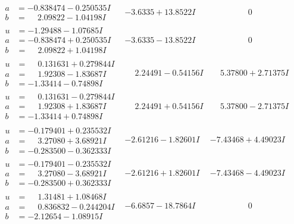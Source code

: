 \documentclass[1p]{elsarticle_modified}
\theoremstyle{definition}
\begin{document}
$$\begin{array}{c|c|c}
\begin{aligned}
a &= -0.838474 - 0.250535 I \\
b &= \phantom{-}2.09822 - 1.04198 I\end{aligned}
 & -3.6335 + 13.8522 I & \phantom{-0.000000 } 0 \\ \hline\begin{aligned}
u &= -1.29488 - 1.07685 I \\
a &= -0.838474 + 0.250535 I \\
b &= \phantom{-}2.09822 + 1.04198 I\end{aligned}
 & -3.6335 - 13.8522 I & \phantom{-0.000000 } 0 \\ \hline\begin{aligned}
u &= \phantom{-}0.131631 + 0.279844 I \\
a &= \phantom{-}1.92308 - 1.83687 I \\
b &= -1.33414 - 0.74898 I\end{aligned}
 & \phantom{-}2.24491 - 0.54156 I & \phantom{-}5.37800 + 2.71375 I \\ \hline\begin{aligned}
u &= \phantom{-}0.131631 - 0.279844 I \\
a &= \phantom{-}1.92308 + 1.83687 I \\
b &= -1.33414 + 0.74898 I\end{aligned}
 & \phantom{-}2.24491 + 0.54156 I & \phantom{-}5.37800 - 2.71375 I \\ \hline\begin{aligned}
u &= -0.179401 + 0.235532 I \\
a &= \phantom{-}3.27080 + 3.68921 I \\
b &= -0.283500 - 0.362333 I\end{aligned}
 & -2.61216 - 1.82601 I & -7.43468 + 4.49023 I \\ \hline\begin{aligned}
u &= -0.179401 - 0.235532 I \\
a &= \phantom{-}3.27080 - 3.68921 I \\
b &= -0.283500 + 0.362333 I\end{aligned}
 & -2.61216 + 1.82601 I & -7.43468 - 4.49023 I \\ \hline\begin{aligned}
u &= \phantom{-}1.31481 + 1.08468 I \\
a &= \phantom{-}0.836832 - 0.244204 I \\
b &= -2.12654 - 1.08915 I\end{aligned}
 & -6.6857 - 18.7864 I & \phantom{-0.000000 } 0 \\ \hline\begin{aligned}

\end{aligned}
\end{array}$$
\end{document}
